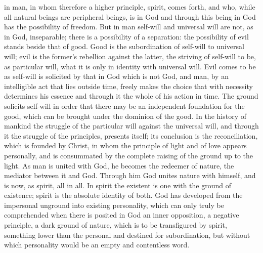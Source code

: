 in man, in whom therefore a higher principle, spirit, comes forth, and
who, while all natural beings are peripheral beings, is in God and
through this being in God has the possibility of freedom. But in man
self-will and universal will are not, as in God, inseparable; there is a
possibility of a separation: the possibility of evil stands beside that
of good. Good is the subordination of self-will to universal will; evil
is the former's rebellion against the latter, the striving of self-will
to be, as particular will, what it is only in identity with universal
will. Evil comes to be as self-will is solicited by that in God which is
not God, and man, by an intelligible act that lies outside time, freely
makes the choice that with necessity determines his essence and through
it the whole of his action in time. The ground solicits self-will in
order that there may be an independent foundation for the good, which can
be brought under the dominion of the good. In the history of mankind the
struggle of the particular will against the universal will, and through
it the struggle of the principles, presents itself; its conclusion is
the reconciliation, which is founded by Christ, in whom the principle of
light and of love appears personally, and is consummated by the complete
raising of the ground up to the light. As man is united with God, he
becomes the redeemer of nature, the mediator between it and God. Through
him God unites nature with himself, and is now, as spirit, all in all. In
spirit the existent is one with the ground of existence; spirit is the
absolute identity of both. God has developed from the impersonal unground
into existing personality, which can only truly be comprehended when
there is posited in God an inner opposition, a negative principle, a dark
ground of nature, which is to be transfigured by spirit,
something lower than the personal and destined for subordination, but
without which personality would be an empty and contentless word.

